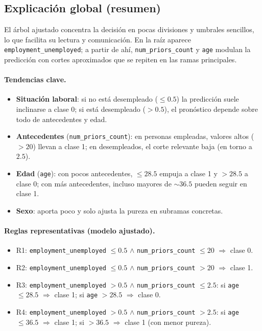 \subsection{Explicación global (resumen)}

El árbol ajustado concentra la decisión en pocas divisiones y umbrales sencillos, lo que facilita su lectura y comunicación. En la raíz aparece \texttt{employment\_unemployed}; a partir de ahí, \texttt{num\_priors\_count} y \texttt{age} modulan la predicción con cortes aproximados que se repiten en las ramas principales.

\paragraph{Tendencias clave.}
\begin{itemize}
  \item \textbf{Situación laboral}: si no está desempleado ($\leq 0.5$) la predicción suele inclinarse a clase 0; si está desempleado ($> 0.5$), el pronóstico depende sobre todo de antecedentes y edad.
  \item \textbf{Antecedentes} (\texttt{num\_priors\_count}): en personas empleadas, valores altos ($>20$) llevan a clase 1; en desempleados, el corte relevante baja (en torno a $2.5$).
  \item \textbf{Edad} (\texttt{age}): con pocos antecedentes, $\leq 28.5$ empuja a clase 1 y $>28.5$ a clase 0; con más antecedentes, incluso mayores de $\sim 36.5$ pueden seguir en clase 1.
  \item \textbf{Sexo}: aporta poco y solo ajusta la pureza en subramas concretas.
\end{itemize}

\paragraph{Reglas representativas (modelo ajustado).}
\vspace{-0.4em}
\begin{itemize}
  \item R1: \texttt{employment\_unemployed} $\leq 0.5$ $\land$ \texttt{num\_priors\_count} $\leq 20$ $\Rightarrow$ clase 0.
  \item R2: \texttt{employment\_unemployed} $\leq 0.5$ $\land$ \texttt{num\_priors\_count} $> 20$ $\Rightarrow$ clase 1.
  \item R3: \texttt{employment\_unemployed} $> 0.5$ $\land$ \texttt{num\_priors\_count} $\leq 2.5$: 
        si \texttt{age} $\leq 28.5$ $\Rightarrow$ clase 1; si \texttt{age} $> 28.5$ $\Rightarrow$ clase 0.
  \item R4: \texttt{employment\_unemployed} $> 0.5$ $\land$ \texttt{num\_priors\_count} $> 2.5$: 
        si \texttt{age} $\leq 36.5$ $\Rightarrow$ clase 1; si $> 36.5$ $\Rightarrow$ clase 1 (con menor pureza).
\end{itemize}

